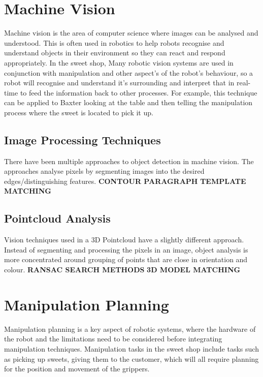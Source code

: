 \section{Machine Vision}
Machine vision is the area of computer science where images can be analysed and understood. This is often used in robotics to help robots recognise and understand objects in their environment so they can react and respond appropriately. In the sweet shop, Many robotic vision systems are used in conjunction with manipulation and other aspect's of the robot's behaviour, so a robot will recognise and understand it's surrounding and interpret that in real-time to feed the information back to other processes. For example, this technique can be applied to Baxter looking at the table and then telling the manipulation process where the sweet is located to pick it up.
\subsection{Image Processing Techniques}
There have been multiple approaches to object detection in machine vision. The approaches analyse pixels by segmenting images into the desired edges/distinguishing features. 
\newline\newline\textbf{CONTOUR PARAGRAPH}
\newline\newline\textbf{TEMPLATE MATCHING}
\subsection{Pointcloud Analysis}
Vision techniques used in a 3D Pointcloud have a slightly different approach. Instead of segmenting and processing the pixels in an image, object analysis is more concentrated around grouping of points that are close in orientation and colour.
\newline\newline\textbf{RANSAC SEARCH METHODS}
\newline\newline\textbf{3D MODEL MATCHING}
\section{Manipulation Planning}
Manipulation planning is a key aspect of robotic systems, where the hardware of the robot and the limitations need to be considered before integrating manipulation techniques. Manipulation tasks in the sweet shop include tasks such as picking up sweets, giving them to the customer, which will all require planning for the position and movement of the grippers.
